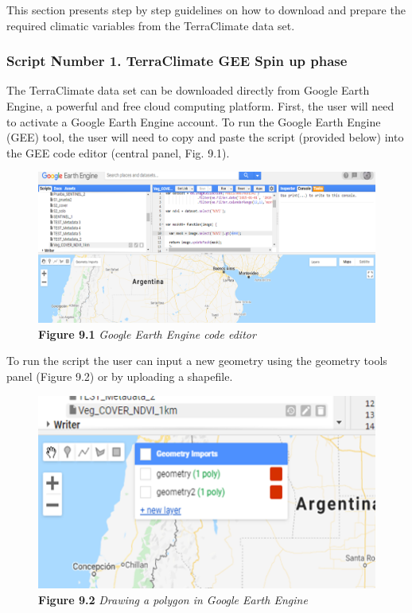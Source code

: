 \documentclass[
  10pt,
  b5paper,
]{book}
\begin{document}
This section presents step by step guidelines on how to download and prepare the required climatic variables from the TerraClimate data set.

\hypertarget{script-number-1.-terraclimate-gee-spin-up-phase}{%
\subsubsection{Script Number 1. TerraClimate GEE Spin up phase}\label{script-number-1.-terraclimate-gee-spin-up-phase}}

The TerraClimate data set can be downloaded directly from Google Earth Engine, a powerful and free cloud computing platform.
First, the user will need to activate a Google Earth Engine account. To run the Google Earth Engine (GEE) tool, the user will need to copy and paste the script (provided below) into the GEE code editor (central panel, Fig. 9.1).

\begin{figure}
\centering
\includegraphics{images/Figure_9.1.png}
\caption{\textbf{Figure 9.1} \emph{Google Earth Engine code editor}}
\end{figure}

To run the script the user can input a new geometry using the geometry tools panel (Figure 9.2) or by uploading a shapefile.

\begin{figure}
\centering
\includegraphics{images/Figure_9.2.png}
\caption{\textbf{Figure 9.2} \emph{Drawing a polygon in Google Earth Engine}}
\end{figure}
\end{document}
